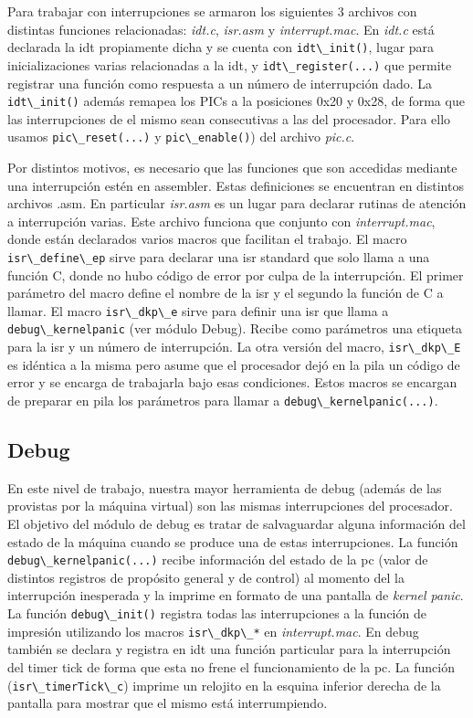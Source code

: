 \documentclass[a4paper]{article}
\newcommand{\file}[1]{\textit{#1}}
\newcommand{\func}[1]{\lstinline{#1}}
\begin{document}
Para trabajar con interrupciones se armaron los siguientes 3 archivos con distintas funciones relacionadas: \file{idt.c}, \file{isr.asm} y \file{interrupt.mac}. En \file{idt.c} está declarada la idt propiamente dicha y se cuenta con \func{idt\_init()}, lugar para inicializaciones varias relacionadas a la idt, y \func{idt\_register(...)} que permite registrar una función como respuesta a un número de interrupción dado. La \func{idt\_init()} además remapea los PICs a la posiciones 0x20 y 0x28, de forma que las interrupciones de el mismo sean consecutivas a las del procesador. Para ello usamos \func{pic\_reset(...)} y \func{pic\_enable()}) del archivo \file{pic.c}. 

Por distintos motivos, es necesario que las funciones que son accedidas mediante una interrupción estén en assembler. Estas definiciones se encuentran en distintos archivos .asm. En particular \file{isr.asm} es un lugar para declarar rutinas de atención a interrupción varias. Este archivo funciona que conjunto con \file{interrupt.mac}, donde están declarados varios macros que facilitan el trabajo. El macro \func{isr\_define\_ep} sirve para declarar una isr standard que solo llama a una función C, donde no hubo código de error por culpa de la interrupción. El primer parámetro del macro define el nombre de la isr y el segundo la función de C a llamar. El macro \func{isr\_dkp\_e} sirve para definir una isr que llama a \func{debug\_kernelpanic} (ver módulo Debug). Recibe como parámetros una etiqueta para la isr y un número de interrupción. La otra versión del macro, \func{isr\_dkp\_E} es idéntica a la misma pero asume que el procesador dejó en la pila un código de error y se encarga de trabajarla bajo esas condiciones. Estos macros se encargan de preparar en pila los parámetros para llamar a \func{debug\_kernelpanic(...)}.

\subsection{Debug}

En este nivel de trabajo, nuestra mayor herramienta de debug (además de las provistas por la máquina virtual) son las mismas interrupciones del procesador. El objetivo del módulo de debug es tratar de salvaguardar alguna información del estado de la máquina cuando se produce una de estas interrupciones. La función \func{debug\_kernelpanic(...)} recibe información del estado de la pc (valor de distintos registros de propósito general y de control) al momento del la interrupción inesperada y la imprime en formato de una pantalla de \emph{kernel panic}. La función \func{debug\_init()} registra todas las interrupciones a la función de impresión utilizando los macros \func{isr\_dkp\_*} en \file{interrupt.mac}. En debug también se declara y registra en idt una función particular para la interrupción del timer tick de forma que esta no frene el funcionamiento de la pc. La función (\func{isr\_timerTick\_c}) imprime un relojito en la esquina inferior derecha de la pantalla para mostrar que el mismo está interrumpiendo. 
\end{document}
